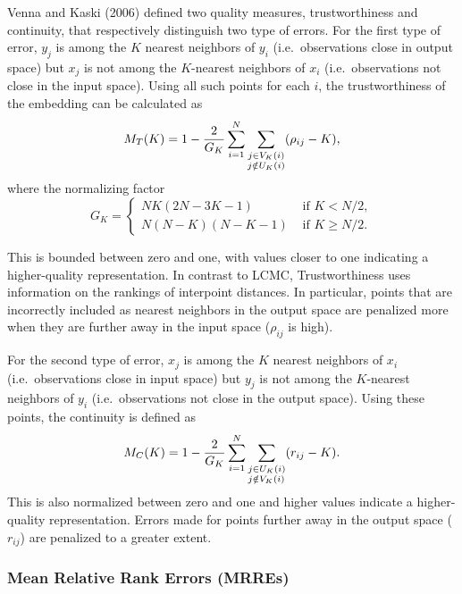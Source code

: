 \documentclass[12pt]{article}
\begin{document}
Venna and Kaski (2006) defined two quality measures, trustworthiness and continuity, that respectively distinguish two type of errors. For the first type of error, \(y_j\) is among the \(K\) nearest neighbors of \(y_i\) (i.e.~observations close in output space) but \(x_j\) is not among the \(K\)-nearest neighbors of \(x_i\) (i.e.~observations not close in the input space). Using all such points for each \(i\), the trustworthiness of the embedding can be calculated as
\begin{equation}\label{eq:trustworthiness}
  M_{T}(K)=1-\frac{2}{G_{K}} \sum_{i=1}^{N} \sum\limits_{\begin{subarray}{c}j \in V_{K}(i)\\j \notin U_{K}(i)\end{subarray}}(\rho_{ij}-K),
\end{equation}
where the normalizing factor
\[
  G_{K}=\left\{
    \begin{array}{ll}
      N K(2 N-3 K-1) & \text { if } K<N / 2, \\
      N(N-K)(N-K-1) & \text { if } K \geq N / 2.
    \end{array}
  \right.
\]

This is bounded between zero and one, with values closer to one indicating a higher-quality representation. In contrast to LCMC, Trustworthiness uses information on the rankings of interpoint distances. In particular, points that are incorrectly included as nearest neighbors in the output space are penalized more when they are further away in the input space (\(\rho_{ij}\) is high).

For the second type of error, \(x_j\) is among the \(K\) nearest neighbors of \(x_i\) (i.e.~observations close in input space) but \(y_j\) is not among the \(K\)-nearest neighbors of \(y_i\) (i.e.~observations not close in the output space). Using these points, the continuity is defined as
\begin{equation}\label{eq:continuity}
  M_{C}(K)=1-\frac{2}{G_{K}} \sum_{i=1}^{N} \sum_{\begin{subarray}{\ell}j \in U_{K}(i) \\j\notin V_{K}(i)\end{subarray}}(r_{ij}-K).
\end{equation}
This is also normalized between zero and one and higher values indicate a higher-quality representation. Errors made for points further away in the output space (\(r_{ij}\)) are penalized to a greater extent.

\hypertarget{mean-relative-rank-errors-mrres}{%
\subsubsection*{Mean Relative Rank Errors (MRREs)}\label{mean-relative-rank-errors-mrres}}
\end{document}
